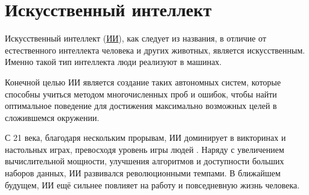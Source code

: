 \section{Искусственный интеллект} \label{ch1:ai}

Искусственный интеллект \cite{Crevier93} (\hyperref[acr:ai]{ИИ}), как следует из названия, в отличие от естественного интеллекта человека и других животных, является искусственным. Именно такой тип интеллекта люди реализуют в машинах.

Конечной целью ИИ является создание таких автономных систем, которые способны учиться методом многочисленных проб и ошибок, чтобы найти оптимальное поведение для достижения максимально возможных целей в сложившемся окружении. \cite{RussellAndNorvig-AI-modern-approach}

С 21 века, благодаря нескольким прорывам, ИИ доминирует в викторинах и настольных играх, превосходя уровень игры людей \cite{Watson} \cite{AlphaGo}. Наряду с увеличением вычислительной мощности, улучшения алгоритмов и доступности больших наборов данных, ИИ развивался революционными темпами. В ближайшем будущем, ИИ ещё сильнее повлияет на работу и повседневную жизнь человека.





%
\newpage %
